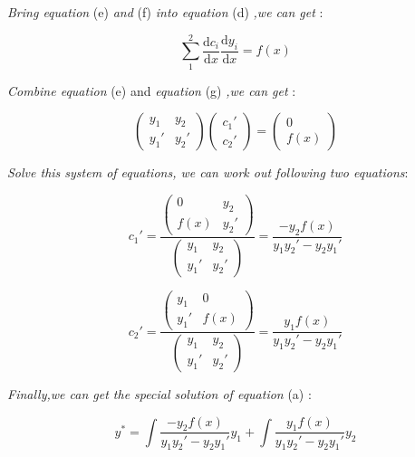 \textit{Bring equation} (e) \textit{and} (f) \textit{into equation} (d) \textit{,we can get} :

\[\sum_{1}^{2} \frac{\mathrm{d} c_i}{\mathrm{d} x} \frac{\mathrm{d} y_i}{\mathrm{d} x}=f(x) \tag{g}\]

\textit{Combine equation} (e) and \textit{equation} (g) \textit{,we can get} :

\[\begin{pmatrix} y_1 & y_2 \\ {y_1}' & {y_2}' \end{pmatrix} \begin{pmatrix} {c_1}' \\ {c_2}' \end{pmatrix} = \begin{pmatrix} 0 \\ f(x) \end{pmatrix} \tag{h} \]

\textit{Solve this system of equations, we can work out following two equations}:

\[ {c_1}'=\frac {\begin{pmatrix} 0 & y_2 \\ f(x) & {y_2}' \end{pmatrix}} {\begin{pmatrix} y_1 & y_2 \\ {y_1}' & {y_2}' \end{pmatrix}} =\frac {-y_2 f(x)}{y_1 {y_2}' - y_2 {y_1}'} \tag{i1} \]

\[ {c_2}'=\frac {\begin{pmatrix} y_1 & 0 \\ {y_1}' & f(x) \end{pmatrix}} {\begin{pmatrix} y_1 & y_2 \\ {y_1}' & {y_2}' \end{pmatrix}} =\frac {y_1 f(x)}{y_1 {y_2}' - y_2 {y_1}'} \tag{i2} \]

\textit{Finally,we can get the special solution of equation} (a) :

\[y^*=\int{\frac {-y_2 f(x)}{y_1 {y_2}' - y_2 {y_1}'}} y_1 + \int{\frac {y_1 f(x)}{y_1 {y_2}' - y_2 {y_1}'}} y_2 \tag{j} \]

